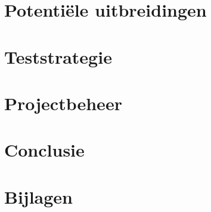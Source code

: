 \documentclass[a4paper,titlepage]{article}
\begin{document}
\begin{empfile}
\section{Potenti\"ele uitbreidingen}


\section{Teststrategie}


\section{Projectbeheer}


\section{Conclusie}

\newpage

\appendix
\section{Bijlagen}

\end{empfile}
\end{document}
